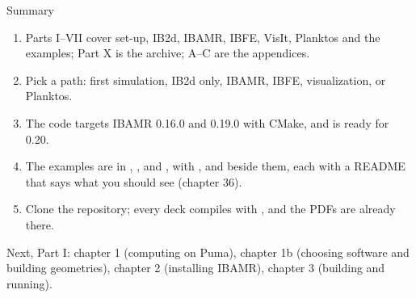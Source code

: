 \documentclass[aspectratio=169,11pt]{beamer}
\begin{document}
\begin{frame}{Summary}
\begin{enumerate}
  \item Parts I--VII cover set-up, IB2d, IBAMR, IBFE, VisIt, Planktos and the examples; Part X is the archive; A--C are the appendices.
  \item Pick a path: first simulation, IB2d only, IBAMR, IBFE, visualization, or Planktos.
  \item The code targets IBAMR 0.16.0 and 0.19.0 with CMake, and is ready for 0.20.
  \item The examples are in , ,  and , with ,  and  beside them, each with a README that says what you should see (chapter 36).
  \item Clone the repository; every deck compiles with , and the PDFs are already there.
\end{enumerate}
\vspace{3mm}
\begin{homebox}
\small Next, Part I: chapter 1 (computing on Puma), chapter 1b (choosing software and building geometries), chapter 2 (installing IBAMR), chapter 3 (building and running).
\end{homebox}
\end{frame}
\end{document}
